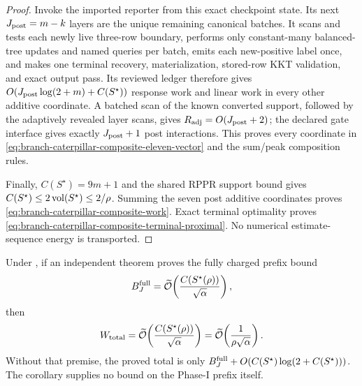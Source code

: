 \begin{proof}
Invoke the imported reporter from this exact checkpoint state.  Its next
$J_{\rm post}=m-k$ layers are the unique remaining canonical batches.  It
scans and tests each newly live three-row boundary, performs only constant-many
balanced-tree updates and named queries per batch, emits each new-positive
label once, and makes one terminal recovery, materialization, stored-row KKT
validation, and exact output pass.  Its reviewed ledger therefore gives
$O(J_{\rm post}\log(2+m)+C(S^\star))$ response work and linear work in every
other additive coordinate.  A batched scan of the known converted support,
followed by the adaptively revealed layer scans, gives
$R_{\rm adj}=O(J_{\rm post}+2)$; the declared gate interface gives exactly
$J_{\rm post}+1$ post interactions.  This proves every coordinate in
\cref{eq:branch-caterpillar-composite-eleven-vector} and the sum/peak
composition rules.

Finally, $C(S^\star)=9m+1$ and the shared RPPR support bound gives
$C(S^\star)\leq2\operatorname{vol}(S^\star)\leq2/\rho$.  Summing the seven post additive
coordinates proves \cref{eq:branch-caterpillar-composite-work}.  Exact
terminal optimality proves
\cref{eq:branch-caterpillar-composite-terminal-proximal}.  No numerical
estimate-sequence energy is transported.
\end{proof}

\begin{corollary}
\label{cor:branch-caterpillar-composite-product-conditional}
Under , if an
independent theorem proves the fully charged prefix bound
\begin{equation}
 B_J^{\rm full}=\widetilde{\mathcal{O}}\!\left(
  \frac{C(S^\star(\rho))}{\sqrt\alpha}
 \right),
 \label{eq:branch-caterpillar-composite-independent-prefix-bound}
\end{equation}
then
\begin{equation}
 W_{\rm total}
 =\widetilde{\mathcal{O}}\!\left(\frac{C(S^\star(\rho))}{\sqrt\alpha}\right)
 =\widetilde{\mathcal{O}}\!\left(\frac1{\rho\sqrt\alpha}\right).
 \label{eq:branch-caterpillar-composite-conditional-product-work}
\end{equation}
Without that premise, the proved total is only
$B_J^{\rm full}+O(C(S^\star)\log(2+C(S^\star)))$.  The corollary supplies no
bound on the Phase-I prefix itself.
\end{corollary}
